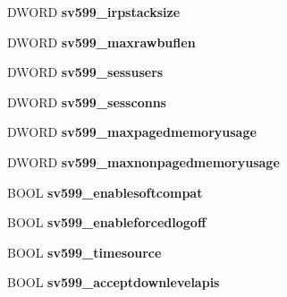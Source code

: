 \begin{DoxyCompactItemize}
D\+W\+O\+RD {\bfseries sv599\+\_\+irpstacksize}
\item 
\mbox{\label{struct___s_e_r_v_e_r___i_n_f_o__599_a0d70f0bcd9959669cd4501770a805fd4}} 
D\+W\+O\+RD {\bfseries sv599\+\_\+maxrawbuflen}
\item 
\mbox{\label{struct___s_e_r_v_e_r___i_n_f_o__599_acca6fcdb44eb8d140b32e4fc02c12553}} 
D\+W\+O\+RD {\bfseries sv599\+\_\+sessusers}
\item 
\mbox{\label{struct___s_e_r_v_e_r___i_n_f_o__599_a60615cdbc046d7e245e84610732c58d0}} 
D\+W\+O\+RD {\bfseries sv599\+\_\+sessconns}
\item 
\mbox{\label{struct___s_e_r_v_e_r___i_n_f_o__599_a12ce15a53e6447369fd089638befa8df}} 
D\+W\+O\+RD {\bfseries sv599\+\_\+maxpagedmemoryusage}
\item 
\mbox{\label{struct___s_e_r_v_e_r___i_n_f_o__599_a146f1a0124fc1856e9e80dfe1e1e84bc}} 
D\+W\+O\+RD {\bfseries sv599\+\_\+maxnonpagedmemoryusage}
\item 
\mbox{\label{struct___s_e_r_v_e_r___i_n_f_o__599_a35285e8b1a3581c2e5c878b30254360b}} 
B\+O\+OL {\bfseries sv599\+\_\+enablesoftcompat}
\item 
\mbox{\label{struct___s_e_r_v_e_r___i_n_f_o__599_a0220b5f58f527595ff82fd6e3621a89e}} 
B\+O\+OL {\bfseries sv599\+\_\+enableforcedlogoff}
\item 
\mbox{\label{struct___s_e_r_v_e_r___i_n_f_o__599_a50e3cc566a72d0f6ab17bda01c5f2af3}} 
B\+O\+OL {\bfseries sv599\+\_\+timesource}
\item 
\mbox{\label{struct___s_e_r_v_e_r___i_n_f_o__599_acf188b645effb9f0f52a4ac25d4d5431}} 
B\+O\+OL {\bfseries sv599\+\_\+acceptdownlevelapis}
\item 
\mbox{\label{struct___s_e_r_v_e_r___i_n_f_o__599_a5b964743a1969d0ba3a04761dee33018}} 

\end{DoxyCompactItemize}
